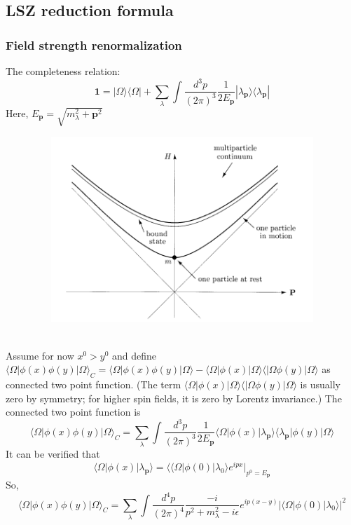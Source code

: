 \documentclass{article}
\begin{document}
\subsection{LSZ reduction formula}
\subsubsection{Field strength renormalization}
The completeness relation:
\[\mathbf{1} = |\Omega\rangle\langle\Omega| +  \sum_{\lambda} \int \frac{d^3p}{(2\pi)^3} \frac{1}{2E_{\mathbf{p}}} |\lambda_{\mathbf{p}}\rangle\langle\lambda_{\mathbf{p}}|\]
Here, $E_{\mathbf{p}} = \sqrt{m_{\lambda}^2 + \mathbf{p}^2}$\\
\begin{figure}[!h]
\centering
\includegraphics[height=7cm ,width=12cm]{./pic/FSR1.png}
\caption*{}
\end{figure}
\\
Assume for now $x^0 > y^0$ and define $\langle \Omega | \phi(x) \phi(y) | \Omega \rangle_{C} = \langle \Omega | \phi(x) \phi(y) | \Omega \rangle - \langle \Omega | \phi(x)| \Omega \rangle \langle | \Omega \phi(y) | \Omega \rangle$ as connected two point function. (The term $\langle \Omega | \phi(x)| \Omega \rangle \langle | \Omega \phi(y) | \Omega \rangle$ is usually zero by symmetry; for higher spin fields, it is zero by Lorentz invariance.) The connected two point function is
\[\langle \Omega | \phi(x) \phi(y) | \Omega \rangle_{C} = \sum_{\lambda} \int \frac{d^3p}{(2\pi)^3} \frac{1}{2E_{\mathbf{p}}} \langle \Omega | \phi(x) |\lambda_{\mathbf{p}}\rangle\langle\lambda_{\mathbf{p}}| \phi(y) | \Omega \rangle\]
It can be verified that
\[\langle \Omega | \phi(x) |\lambda_{\mathbf{p}}\rangle = \langle \langle \Omega | \phi(0) | \lambda_0 \rangle e^{ipx} |_{p^0 = E_{\mathbf{p}}}\]
So,
\[\langle \Omega | \phi(x) \phi(y) | \Omega \rangle_C = \sum_{\lambda} \int \frac{d^4p}{(2\pi)^4} \frac{-i}{p^2 + m_{\lambda}^2 -i\epsilon} e^{ip(x-y)} |\langle \Omega | \phi(0) | \lambda_0 \rangle|^2\]
\end{document}
